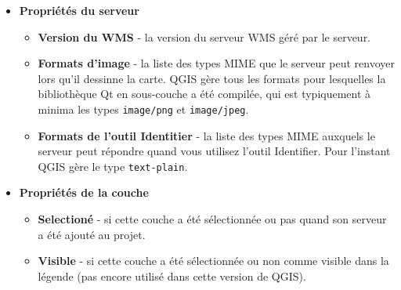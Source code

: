 \begin{itemize}
\item \textbf{Propri\'et\'es du serveur}

\begin{itemize}
\item \textbf{Version du WMS}      - la version du serveur WMS g\'er\'e par le
serveur.

\item \textbf{Formats d'image}    - la liste des types MIME que le serveur peut
renvoyer lors qu'il dessinne la carte. QGIS g\`ere tous les formats pour
lesquelles la biblioth\`eque Qt en sous-couche a \'et\'e compil\'ee, qui est
typiquement \`a minima les types \texttt{image/png} et \texttt{image/jpeg}.

\item \textbf{Formats de l'outil Identitier} - la liste des types
MIME auxquels le serveur peut r\'epondre quand vous utilisez l'outil
Identifier. Pour l'instant QGIS g\`ere le type \texttt{text-plain}.
\end{itemize}

\item \textbf{Propri\'et\'es de la couche}

\begin{itemize}
\item \textbf{Selection\'e}         - si cette couche a \'et\'e s\'electionn\'ee ou pas
quand son serveur a \'et\'e ajout\'e au projet.

\item \textbf{Visible}          - si cette couche a \'et\'e s\'electionn\'ee ou non
comme visible dans la l\'egende (pas encore utilis\'e dans cette version de QGIS).


\end{itemize}
\end{itemize}
